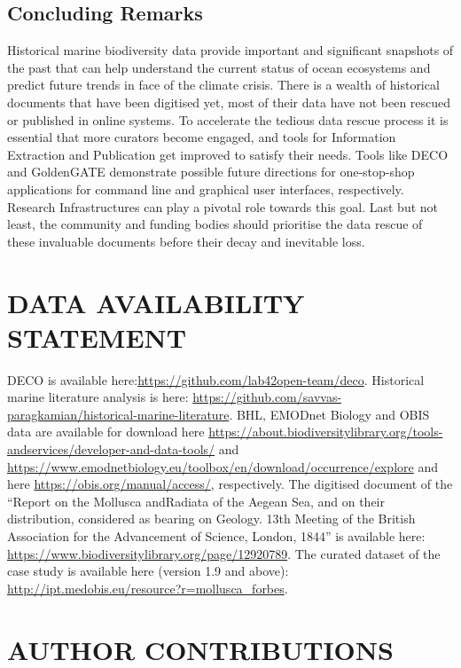    \subsection{Concluding Remarks}
   Historical marine biodiversity data provide important and significant
snapshots of the past that can help understand the current status of ocean
ecosystems and predict future trends in face of the climate crisis. There is a
wealth of historical documents that have been digitised yet, most of their data
have not been rescued or published in online systems. To accelerate the tedious
data rescue process it is essential that more curators become engaged, and
tools for Information Extraction and Publication get improved to satisfy their
needs. Tools like DECO and GoldenGATE demonstrate possible future directions
for one-stop-shop applications for command line and graphical user interfaces,
respectively. Research Infrastructures can play a pivotal role towards this
goal. Last but not least, the community and funding bodies should prioritise
the data rescue of these invaluable documents before their decay and inevitable
loss.


\section*{DATA AVAILABILITY STATEMENT}

DECO is available here:\url{https://github.com/lab42open-team/deco}. Historical
marine literature analysis is here:
\href{https://github.com/savvas-paragkamian/historical-marine-literature}{https://github.com/savvas-paragkamian/historical-marine-literature}.
BHL, EMODnet Biology and OBIS data are available for download here
\href{https://about.biodiversitylibrary.org/tools-andservices/developer-and-data-tools/}{https://about.biodiversitylibrary.org/tools-andservices/developer-and-data-tools/}
and \url{https://www.emodnetbiology.eu/toolbox/en/download/occurrence/explore}
and here \url{https://obis.org/manual/access/}, respectively. The digitised
document of the “Report on the Mollusca andRadiata of the Aegean Sea, and on
their distribution, considered as bearing on Geology. 13th Meeting of the
British Association for the Advancement of Science, London, 1844” is available
here: \url{https://www.biodiversitylibrary.org/page/12920789}. The curated
dataset of the case study is available here (version 1.9 and above):
\url{http://ipt.medobis.eu/resource?r=mollusca_forbes}.

\section*{AUTHOR CONTRIBUTIONS}

